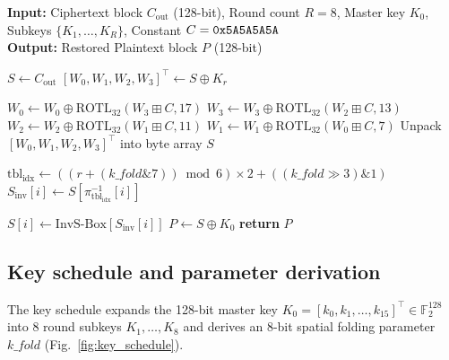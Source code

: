 \documentclass[10pt,twocolumn]{article}
\begin{document}
\begin{algorithm}[htbp]
\caption{Rubik-4D decryption pipeline.}
\label{alg:rubik4d_dec}
\textbf{Input:} Ciphertext block $C_{\text{out}}$ (128-bit), Round count $R=8$, Master key $K_0$, Subkeys $\{K_1, \dots, K_R\}$, Constant $C = \text{\texttt{0x5A5A5A5A}}$ \\
\textbf{Output:} Restored Plaintext block $P$ (128-bit)
\begin{algorithmic}[1]
\STATE {}
\STATE $S \leftarrow C_{\text{out}}$
    \STATE {}
    \STATE $[W_0, W_1, W_2, W_3]^\top \leftarrow S \oplus K_r$
    
    \STATE {}
    \STATE $W_0 \leftarrow W_0 \oplus \text{ROTL}_{32}(W_3 \boxplus C, 17)$
    \STATE $W_3 \leftarrow W_3 \oplus \text{ROTL}_{32}(W_2 \boxplus C, 13)$
    \STATE $W_2 \leftarrow W_2 \oplus \text{ROTL}_{32}(W_1 \boxplus C, 11)$
    \STATE $W_1 \leftarrow W_1 \oplus \text{ROTL}_{32}(W_0 \boxplus C, 7)$
    \STATE Unpack $[W_0, W_1, W_2, W_3]^\top$ into byte array $S$
    
    \STATE {}
    \STATE $\text{tbl}_{\text{idx}} \leftarrow \left( (r + (\mathit{k\_fold} \mathbin{\&} 7)) \bmod 6 \right) \times 2 + ((\mathit{k\_fold} \gg 3) \mathbin{\&} 1)$
        \STATE $S_{\text{inv}}[i] \leftarrow S[\pi_{\text{tbl}_{\text{idx}}}^{-1}[i]]$
    \ENDFOR
    
    \STATE {}
        \STATE $S[i] \leftarrow \text{InvS-Box}[S_{\text{inv}}[i]]$
    \ENDFOR
\ENDFOR
\STATE {}
\STATE $P \leftarrow S \oplus K_0$
\STATE \textbf{return} $P$
\end{algorithmic}
\end{algorithm}

\subsection{Key schedule and parameter derivation}
The key schedule expands the 128-bit master key $K_0 = [k_0, k_1, \dots, k_{15}]^\top \in \mathbb{F}_2^{128}$ into 8 round subkeys $K_1, \dots, K_8$ and derives an 8-bit spatial folding parameter $\mathit{k\_fold}$ (Fig.~\ref{fig:key_schedule}).
\end{document}
